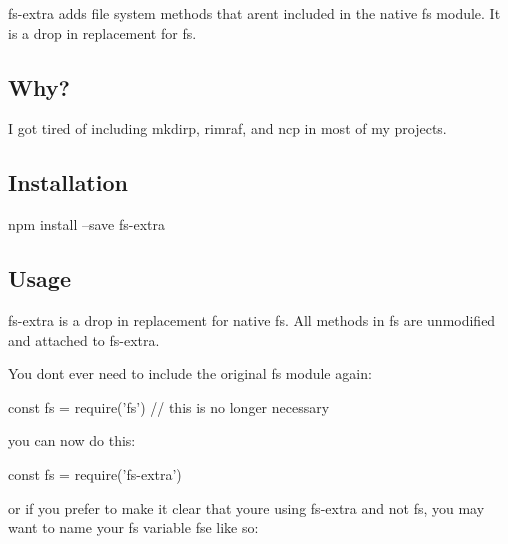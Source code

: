 {\ttfamily fs-\/extra} adds file system methods that aren\textquotesingle{}t included in the native {\ttfamily fs} module. It is a drop in replacement for {\ttfamily fs}.

\href{https://www.npmjs.org/package/fs-extra}{\tt } \href{http://travis-ci.org/jprichardson/node-fs-extra}{\tt } \href{https://ci.appveyor.com/project/jprichardson/node-fs-extra/branch/master}{\tt } \href{https://www.npmjs.org/package/fs-extra}{\tt } \href{https://coveralls.io/r/jprichardson/node-fs-extra}{\tt }

\href{https://github.com/feross/standard}{\tt }

\subsection*{Why? }

I got tired of including {\ttfamily mkdirp}, {\ttfamily rimraf}, and {\ttfamily ncp} in most of my projects.

\subsection*{Installation }

\begin{DoxyVerb}npm install --save fs-extra
\end{DoxyVerb}


\subsection*{Usage }

{\ttfamily fs-\/extra} is a drop in replacement for native {\ttfamily fs}. All methods in {\ttfamily fs} are unmodified and attached to {\ttfamily fs-\/extra}.

You don\textquotesingle{}t ever need to include the original {\ttfamily fs} module again\+:


\begin{DoxyCode}
const fs = require('fs') // this is no longer necessary
\end{DoxyCode}


you can now do this\+:


\begin{DoxyCode}
const fs = require('fs-extra')
\end{DoxyCode}


or if you prefer to make it clear that you\textquotesingle{}re using {\ttfamily fs-\/extra} and not {\ttfamily fs}, you may want to name your {\ttfamily fs} variable {\ttfamily fse} like so\+:


